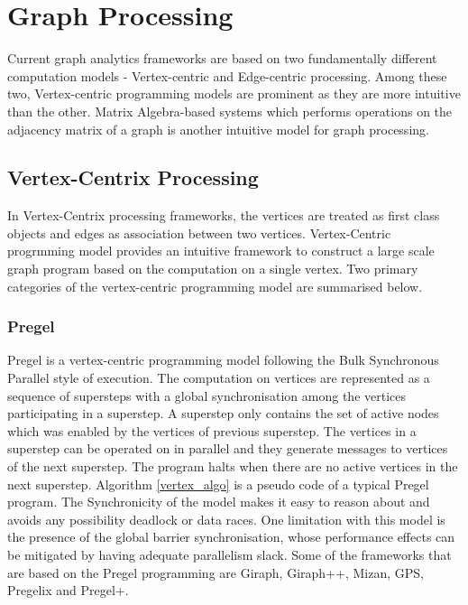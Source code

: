 \section{Graph Processing}


Current graph analytics frameworks are based on two fundamentally different computation models - Vertex-centric and Edge-centric processing. Among these two, Vertex-centric programming models are prominent as they are more intuitive than the other.   Matrix Algebra-based systems which performs operations on the adjacency matrix of a graph is another intuitive model for graph processing.

\subsection{Vertex-Centrix Processing}
In Vertex-Centrix processing frameworks, the vertices are treated as first class objects and edges as association between two vertices. Vertex-Centric progrmming model provides an intuitive framework to construct a large scale graph program based on the computation on a single vertex. Two primary categories of the vertex-centric programming model are summarised below.

\subsubsection{Pregel}
Pregel\cite{Pregel} is a vertex-centric programming model following the Bulk Synchronous Parallel style of execution. The computation on vertices are represented as a sequence of supersteps with a global synchronisation among the vertices participating in a superstep. A superstep only contains the set of active nodes which was enabled by the vertices of previous superstep. The vertices in a superstep can be operated on in parallel and they generate messages to vertices of the next superstep. The program halts when there are no active vertices in the next superstep. Algorithm \ref{vertex_algo} is a pseudo code of a typical Pregel program. The Synchronicity of the model makes it easy to reason about and avoids any possibility deadlock or data races. One limitation with this model is the presence of the global barrier synchronisation, whose performance effects can be mitigated by having adequate parallelism slack. Some of the frameworks that are based on the Pregel programming are Giraph, Giraph++, Mizan, GPS, Pregelix and Pregel+.

